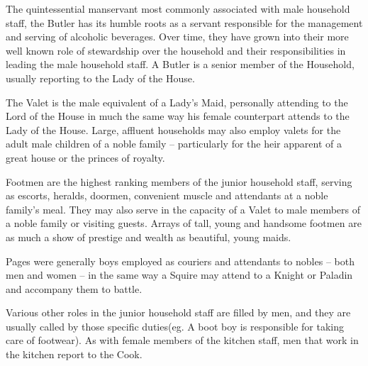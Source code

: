  

The quintessential manservant most commonly associated with male household staff, the Butler has its humble roots as a servant responsible for the management and serving of alcoholic beverages. Over time, they have grown into their more well known role of stewardship over the household and their responsibilities in leading the male household staff. A Butler is a senior member of the Household, usually reporting to the Lady of the House.

 

The Valet is the male equivalent of a Lady’s Maid, personally attending to the Lord of the House in much the same way his female counterpart attends to the Lady of the House. Large, affluent households may also employ valets for the adult male children of a noble family – particularly for the heir apparent of a great house or the princes of royalty.

 

Footmen are the highest ranking members of the junior household staff, serving as escorts, heralds, doormen, convenient muscle and attendants at a noble family’s meal. They may also serve in the capacity of a Valet to male members of a noble family or visiting guests. Arrays of tall, young and handsome footmen are as much a show of prestige and wealth as beautiful, young maids.

 

Pages were generally boys employed as couriers and attendants to nobles – both men and women – in the same way a Squire may attend to a Knight or Paladin and accompany them to battle.

 

Various other roles in the junior household staff are filled by men, and they are usually called by those specific duties(eg. A boot boy is responsible for taking care of footwear). As with female members of the kitchen staff, men that work in the kitchen report to the Cook.